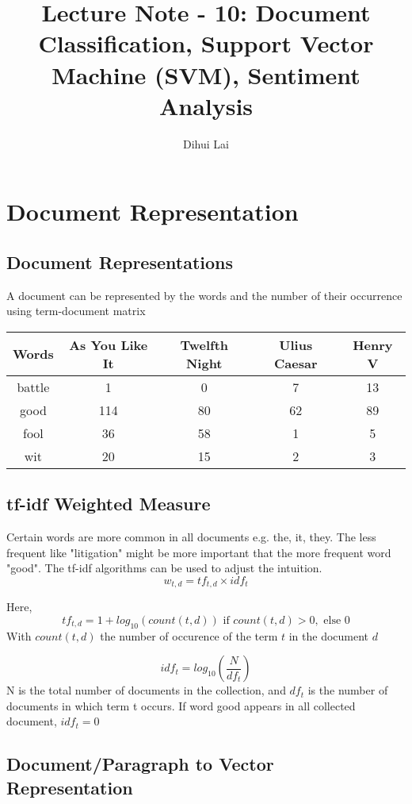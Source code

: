 \documentclass[12pt, oneside]{article}
\title{Lecture Note - 10: Document Classification, Support Vector Machine (SVM), Sentiment Analysis}
\author{Dihui Lai}
\begin{document}
\maketitle
\tableofcontents

\vspace{.25in}


\section{Document Representation}

\subsection{Document Representations}
A document can be represented by the words and the number of their occurrence using term-document matrix
\begin{center}
 \begin{tabular}{c c c c c} 
 \hline
 Words & As You Like It& Twelfth Night& Ulius Caesar& Henry V\\ [0.5ex] 
 \hline\hline
 battle & 1 & 0 & 7 &13 \\ 
 \hline
 good & 114 & 80 &62 & 89\\
 \hline
 fool & 36 & 58 & 1 & 5 \\
 \hline
 wit & 20 & 15 & 2 & 3 \\
 \hline
\end{tabular}
\end{center}



\subsection{tf-idf Weighted Measure}
Certain words are more common in all documents e.g. the, it, they. The less frequent like "litigation" might be more important that the more frequent word "good". The tf-idf algorithms can be used to adjust the intuition.
$$
w_{t,d} = tf_{t,d}\times idf_{t}
$$

Here,
$$
tf_{t, d}=1 + log_{10}(count(t, d)) \text{ if } count(t, d) > 0, \text{ else } 0
$$
With $count(t, d)$  the number of occurence of the term $t$ in the document $d$

$$
idf_{t}=log_{10}\left(\frac{N}{df_t}\right)
$$ 
N is the total number of documents in the collection, and $df_t$ is the number of documents in which term t occurs. If word good appears in all collected document, $idf_t=0$


\subsection{Document/Paragraph to Vector Representation}
\end{document}
